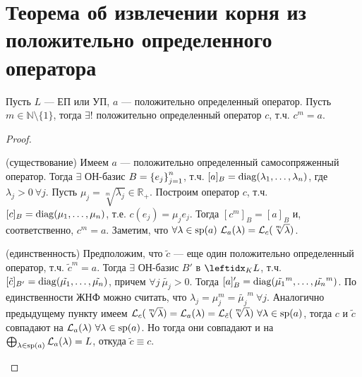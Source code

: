 \section{Теорема об извлечении корня из положительно определенного оператора}

\begin{thm*}
    Пусть $L$ --- ЕП или УП, $a$ --- положительно определенный оператор. Пусть $m \in \mathbb{N} \setminus \{1\}$, тогда $\exists!$ положительно определенный оператор $c$, т.ч. $c^m = a$.
\end{thm*}

\begin{proof}
    \begin{proofpart}{(существование)}
        Имеем $a$ --- положительно определенный самосопряженный оператор. Тогда $\exists$ ОН-базис $B = \left\{e_j\right\}_{j=1}^{n}$, т.ч. $[a]_B = \operatorname{diag}(\lambda_1, \dots, \lambda_n)$, где $\lambda_j > 0\ \forall j$. Пусть $\mu_j = \sqrt[m]{\lambda_j} \in \mathbb{R}_+$. Построим оператор $c$, т.ч. $[c]_B = \operatorname{diag}(\mu_1, \dots, \mu_n)$, т.е. $c(e_j) = \mu_j e_j$. Тогда $[c^m]_B = [a]_B$ и, соответственно, $c^m = a$. Заметим, что $\forall \lambda \in \spec(a)\ \mathcal{L}_a(\lambda) = \mathcal{L}_c (\sqrt[m]{\lambda})$.
    \end{proofpart}

    \begin{proofpart}{(единственность)}
        Предположим, что $\tilde{c}$ --- еще один положительно определенный оператор, т.ч. $\tilde{c}^m = a$. Тогда $\exists$ ОН-базис $B'$ в $\lsub{K}{L}$, т.ч. $[\tilde{c}]_{B'} = \operatorname{diag}(\tilde{\mu_1}, \dots, \tilde{\mu_n})$, причем $\forall j\ \tilde{\mu_j} > 0$. Тогда $[a]_B' = \operatorname{diag}(\tilde{\mu_1}^m, \dots, \tilde{\mu_n}^m)$. По единственности ЖНФ можно считать, что $\lambda_j = \mu_j^m = \tilde{\mu_j}^m\ \forall j$. Аналогично предыдущему пункту имеем $\mathcal{L}_c(\sqrt[m]{\lambda}) = \mathcal{L}_a(\lambda) = \mathcal{L}_{\tilde{c}}(\sqrt[m]{\lambda})\ \forall \lambda \in \spec(a)$, тогда $c$ и $\tilde{c}$ совпадают на $\mathcal{L}_a(\lambda)\ \forall \lambda \in \operatorname{sp}(a)$. Но тогда они совпадают и на $\bigoplus_{\lambda \in \operatorname{sp}(a)} \mathcal{L}_a(\lambda) = L$, откуда $\tilde{c} \equiv c$.
    \end{proofpart}
\end{proof}
